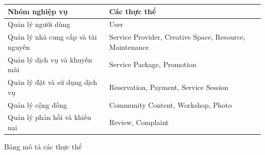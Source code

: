 \begin{center}
\scriptsize
\begin{tabular}{p{.25\linewidth} p{.65\linewidth}}
\toprule
Nhóm nghiệp vụ & Các thực thể \\
\midrule
Quản lý người dùng & User \\
Quản lý nhà cung cấp và tài nguyên & Service Provider, Creative Space, Resource, Maintenance \\
Quản lý dịch vụ và khuyến mãi & Service Package, Promotion \\
Quản lý đặt và sử dụng dịch vụ & Reservation, Payment, Service Session \\
Quản lý cộng đồng & Community Content, Workshop, Photo \\
Quản lý phản hồi và khiếu nại & Review, Complaint \\
\bottomrule
\end{tabular}
\end{center}


Bảng mô tả các thực thể

